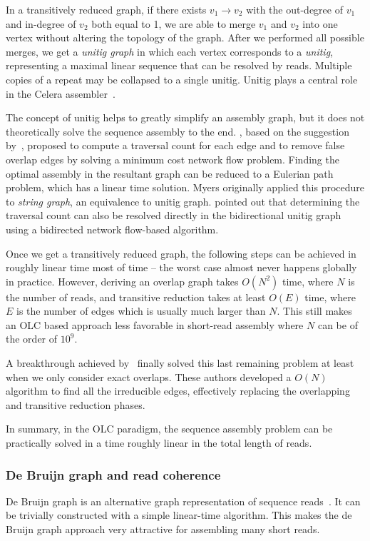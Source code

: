 \documentclass{bioinfo}
\begin{document}
\begin{methods}
In a transitively reduced graph, if there exists $v_1\to v_2$ with the
out-degree of $v_1$ and in-degree of $v_2$ both equal to 1, we are able
to merge $v_1$ and $v_2$ into one vertex without altering the topology of the
graph. After we performed all possible merges, we get a \emph{unitig graph} in
which each vertex corresponds to a \emph{unitig}, representing a maximal linear
sequence that can be resolved by reads. Multiple copies of a repeat may
be collapsed to a single unitig. Unitig plays a central role in the Celera
assembler~\citep{Myers:2000kl}.

The concept of unitig helps to greatly simplify an assembly graph, but it does
not theoretically solve the sequence assembly to the end. \citet{Myers:2005bh},
based on the suggestion by~\citet{Pevzner:2001vn}, proposed to compute a
traversal count for each edge and to remove false overlap edges by solving a
minimum cost network flow problem. Finding the optimal assembly in the resultant
graph can be reduced to a Eulerian path problem, which has a linear time
solution. Myers originally applied this procedure to \emph{string graph},
an equivalence to unitig graph. \citet{Medvedev:2009ve} pointed out
that determining the traversal count can also be resolved directly in the
bidirectional unitig graph using a bidirected network flow-based algorithm.

Once we get a transitively reduced graph, the following steps can be achieved
in roughly linear time most of time -- the worst case almost never happens
globally in practice. However, deriving an overlap graph takes $O(N^2)$ time,
where $N$ is the number of reads, and transitive reduction takes at least
$O(E)$ time, where $E$ is the number of edges which is usually much larger than
$N$. This still makes an OLC based approach less favorable in short-read
assembly where $N$ can be of the order of $10^9$.

A breakthrough achieved by~\citet{Simpson:2010uq,Simpson:2011ly} finally solved
this last remaining problem at least when we only consider exact overlaps.
These authors developed a $O(N)$ algorithm to find all the irreducible edges,
effectively replacing the overlapping and transitive reduction phases.

In summary, in the OLC paradigm, the sequence assembly problem can be
practically solved in a time roughly linear in the total length of reads.

\subsubsection{De Bruijn graph and read coherence}
De Bruijn graph is an alternative graph representation of sequence
reads~\citep{Idury:1995oq}.  It can be trivially constructed with a simple
linear-time algorithm. This makes the de Bruijn graph approach very attractive
for assembling many short reads.


\end{methods}
\end{document}
